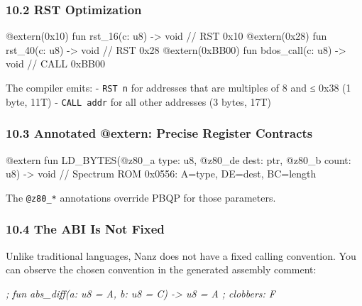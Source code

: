 \documentclass[
  11pt,
  a4paper,
]{report}
\newenvironment{Shaded}{\begin{snugshade}\small}{\end{snugshade}}
\newcommand{\CommentTok}[1]{\textcolor[rgb]{0.56,0.35,0.01}{\textit{#1}}}
\newcommand{\NormalTok}[1]{#1}
\begin{document}
\subsubsection{10.2 RST Optimization}\label{rst-optimization}

\begin{Shaded}
\begin{Highlighting}[]
\NormalTok{@extern(0x10) fun rst\_16(c: u8) {-}\textgreater{} void   // RST 0x10}
\NormalTok{@extern(0x28) fun rst\_40(c: u8) {-}\textgreater{} void   // RST 0x28}
\NormalTok{@extern(0xBB00) fun bdos\_call(c: u8) {-}\textgreater{} void  // CALL 0xBB00}
\end{Highlighting}
\end{Shaded}

The compiler emits: - \texttt{RST\ n} for addresses that are multiples
of 8 and ≤ 0x38 (1 byte, 11T) - \texttt{CALL\ addr} for all other
addresses (3 bytes, 17T)

\subsubsection{10.3 Annotated @extern: Precise Register
Contracts}\label{annotated-extern-precise-register-contracts}

\begin{Shaded}
\begin{Highlighting}[]
\NormalTok{@extern fun LD\_BYTES(@z80\_a type: u8, @z80\_de dest: ptr, @z80\_b count: u8) {-}\textgreater{} void}
\NormalTok{// Spectrum ROM 0x0556: A=type, DE=dest, BC=length}
\end{Highlighting}
\end{Shaded}

The \texttt{@z80\_*} annotations override PBQP for those parameters.

\subsubsection{10.4 The ABI Is Not Fixed}\label{the-abi-is-not-fixed}

Unlike traditional languages, Nanz does not have a fixed calling
convention. You can observe the chosen convention in the generated
assembly comment:

\begin{Shaded}
\begin{Highlighting}[]
\CommentTok{; fun abs\_diff(a: u8 = A, b: u8 = C) {-}\textgreater{} u8 = A ; clobbers: F}
\end{Highlighting}
\end{Shaded}
\end{document}
